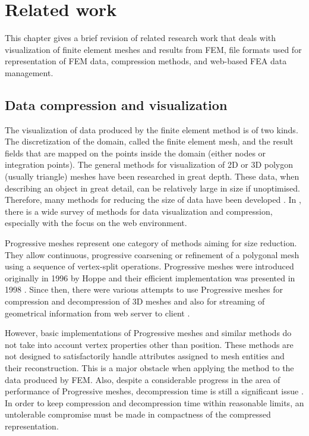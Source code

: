 \chapter{Related work}
\label{chapter:related-work}


This chapter gives a brief revision of related research work that deals with visualization of finite element meshes and results from FEM, file formats used for representation of FEM data, compression methods, and web-based FEA data management.


\section{Data compression and visualization}

The visualization of data produced by the finite element method is of two kinds. The discretization of the domain, called the finite element mesh, and the result fields that are mapped on the points inside the domain (either nodes or integration points). The general methods for visualization of 2D or 3D polygon (usually triangle) meshes have been researched in great depth. These data, when describing an object in great detail, can be relatively large in size if unoptimised. Therefore, many methods for reducing the size of data have been developed \cite{Alliez2005}. In \cite{Evans2014}, there is a wide survey of methods for data visualization and compression, especially with the focus on the web environment.

Progressive meshes represent one category of methods aiming for size reduction. They allow continuous, progressive coarsening or refinement of a polygonal mesh using a sequence of vertex-split operations. Progressive meshes were introduced originally in 1996 by Hoppe \cite{Hoppe1996} and their efficient implementation was presented in 1998 \cite{Hoppe1998}. Since then, there were various attempts to use Progressive meshes for compression and decompression of 3D meshes \cite{Gudukbay2002, Valette2004, Valette2009, Lavoue2013} and also for streaming of geometrical information from web server to client \cite{Alliez2001, Maglo2012}.

However, basic implementations of Progressive meshes and similar methods do not take into account vertex properties other than position. These methods are not designed to satisfactorily handle attributes assigned to mesh entities and their reconstruction. This is a major obstacle when applying the method to the data produced by FEM. Also, despite a considerable progress in the area of performance of Progressive meshes, decompression time is still a significant issue \cite{Limper2013}. In order to keep compression and decompression time within reasonable limits, an untolerable compromise must be made in compactness of the compressed representation.

